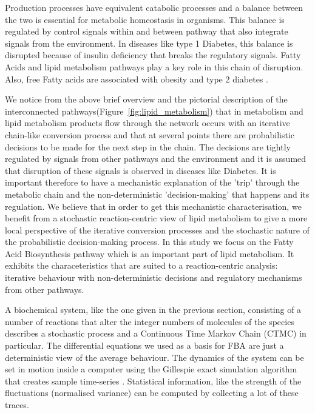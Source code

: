 Production processes have equivalent catabolic
processes and a balance between the two is essential for metabolic
homeostasis in organisms. This balance is regulated by control signals
within and
between pathway that also integrate signals from the
environment. In diseases like type 1 Diabetes, this balance is
disrupted because of insulin deficiency that breaks the regulatory
signals. Fatty Acids and lipid metabolism pathways play a key role
in this chain of disruption. Also, free Fatty acids are
associated with obesity and type 2 diabetes \cite [] {boden2002free}.

We notice from the above brief overview and the pictorial description
of the interconnected pathways(Figure~\ref{fig:lipid_metabolism}) that
in metabolism and lipid metabolism products flow through the
network occurs with an iterative chain-like conversion process and that at
several points there are probabilistic decisions to be made for the next step in the
chain. The decisions are tightly regulated by signals from other
pathways and the environment and it is assumed that disruption of these signals is
observed in diseases like Diabetes. It is important therefore to have
a mechanistic explanation of the 'trip' through the metabolic chain
and the non-deterministic 'decision-making' that happens and its regulation. We believe
that in order to get this mechanistic characterisation, we
benefit from a stochastic reaction-centric view of lipid metabolism to
give a more local perspective of the iterative conversion processes
and the stochastic nature of the probabilistic
decision-making process. In this study we
focus on the Fatty Acid Biosynthesis pathway which is an important
part of lipid metabolism. It exhibits the characeteristics that are
suited to a reaction-centric analysis: iterative behaviour with
non-deterministic decisions and regulatory mechanisms from other pathways.

A biochemical system, like the one given in the previous section,
consisting of a number of reactions that alter the integer numbers of
molecules of the species describes a stochastic process and a Continuous
Time Markov Chain (CTMC) in particular. The differential equations we used as
a basis for FBA are just a
deterministic view of the average behaviour. The dynamics of the
system can be set in motion inside a computer using the Gillespie
exact simulation algorithm that creates sample
time-series \cite [] {gillespie1977exact}. Statistical information, like the strength of the
fluctuations (normalised variance) can be computed by collecting a lot
of these traces.

